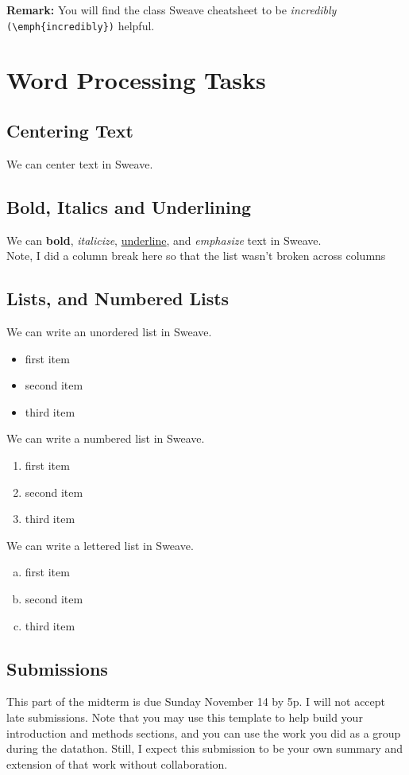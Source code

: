 \documentclass{article}\usepackage[]{graphicx}\usepackage[]{xcolor}
\begin{document}
\begin{multicols}{2}
\noindent \textbf{Remark:} You will find the class Sweave cheatsheet to be \textit{incredibly} \verb|(\emph{incredibly})| helpful.





\section{Word Processing Tasks}
\subsection{Centering Text}
\begin{center}
We can center text in Sweave.
\end{center}

\subsection{Bold, Italics and Underlining}
We can \textbf{bold}, \textit{italicize}, \underline{underline}, and \emph{emphasize} text in Sweave.
\\ \indent Note, I did a column break here so that the list wasn't broken across columns
\columnbreak
\subsection{Lists, and Numbered Lists}
We can write an unordered list in Sweave.
\begin{itemize}\itemsep0em
  \item first item
  \item second item
  \item third item
\end{itemize}
We can write a numbered list in Sweave.
\begin{enumerate}[1.]\itemsep0em
  \item first item
  \item second item
  \item third item
\end{enumerate}
We can write a lettered list in Sweave.
\begin{enumerate}[a.]\itemsep0em
  \item first item
  \item second item
  \item third item
\end{enumerate}


\subsection{Submissions}
This part of the midterm is due Sunday November 14 by 5p. I will not accept late submissions. Note that you may use this template to help build your introduction and methods sections, and you can use the work you did as a group during the datathon. Still, I expect this submission to be your own summary and extension of that work without collaboration.


\end{multicols}
\end{document}
